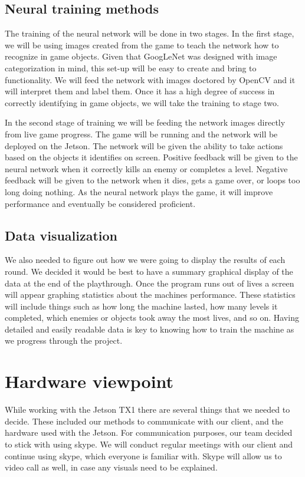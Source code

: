 \documentclass{scrreprt}
\begin{document}
\subsection{Neural training methods}%

The training of the neural network will be done in two stages.
In the first stage, we will be using images created from the game to teach the network how to recognize in game objects.
Given that GoogLeNet was designed with image categorization in mind, this set-up will be easy to create and bring to functionality.
We will feed the network with images doctored by OpenCV and it will interpret them and label them.
Once it has a high degree of success in correctly identifying in game objects, we will take the training to stage two.

In the second stage of training we will be feeding the network images directly from live game progress.
The game will be running and the network will be deployed on the Jetson.
The network will be given the ability to take actions based on the objects it identifies on screen.
Positive feedback will be given to the neural network when it correctly kills an enemy or completes a level.
Negative feedback will be given to the network when it dies, gets a game over, or loops too long doing nothing.
As the neural network plays the game, it will improve performance and eventually be considered proficient.

\subsection{Data visualization}%

We also needed to figure out how we were going to display the results of each round.
We decided it would be best to have a summary graphical display of the data at the end of the playthrough.
Once the program runs out of lives a screen will appear graphing statistics about the machines performance.
These statistics will include things such as how long the machine lasted, how many levels it completed, which enemies or objects took away the most lives, and so on.
Having detailed and easily readable data is key to knowing how to train the machine as we progress through the project.

\section{Hardware viewpoint}%

While working with the Jetson TX1 there are several things that we needed to decide.
These included our methods to communicate with our client, and the hardware used with the Jetson.
For communication purposes, our team decided to stick with using skype.
We will conduct regular meetings with our client and continue using skype, which everyone is familiar with.
Skype will allow us to video call as well, in case any visuals need to be explained.
\end{document}

